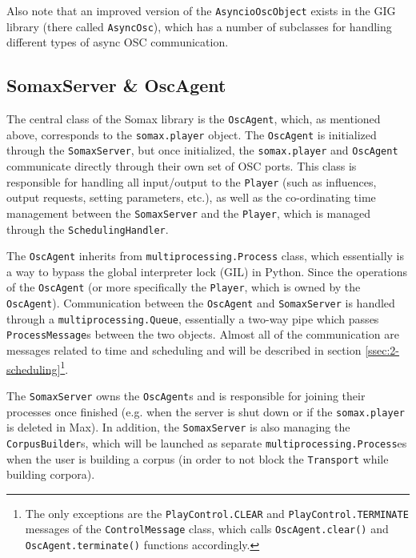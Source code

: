 Also note that an improved version of the \texttt{AsyncioOscObject} exists in the GIG library (there called \texttt{AsyncOsc}), which has a number of subclasses for handling different types of async OSC communication.


\subsection{SomaxServer \& OscAgent}\label{ssec:2-server-agent}
The central class of the Somax library is the \texttt{OscAgent}, which, as mentioned above, corresponds to the \texttt{somax.player} object. The \texttt{OscAgent} is initialized through the \texttt{SomaxServer}, but once initialized, the \texttt{somax.player} and \texttt{OscAgent} communicate directly through their own set of OSC ports. This class is responsible for handling all input/output to the \texttt{Player} (such as influences, output requests, setting parameters, etc.), as well as the co-ordinating time management between the \texttt{SomaxServer} and the \texttt{Player}, which is managed through the \texttt{SchedulingHandler}.

The \texttt{OscAgent} inherits from \texttt{multiprocessing.Process} class, which essentially is a way to bypass the global interpreter lock (GIL) in Python. Since the operations of the \texttt{OscAgent} (or more specifically the \texttt{Player}, which is owned by the \texttt{OscAgent}). Communication between the \texttt{OscAgent} and \texttt{SomaxServer} is handled through a \texttt{multiprocessing.Queue}, essentially a two-way pipe which passes \texttt{ProcessMessage}s between the two objects. Almost all of the communication are messages related to time and scheduling and will be described in section \ref{ssec:2-scheduling}\footnote{The only exceptions are the \texttt{PlayControl.CLEAR} and \texttt{PlayControl.TERMINATE} messages of the \texttt{ControlMessage} class, which calls \texttt{OscAgent.clear()} and \texttt{OscAgent.terminate()} functions accordingly.}.

The \texttt{SomaxServer} owns the \texttt{OscAgent}s and is responsible for joining their processes once finished (e.g. when the server is shut down or if the \texttt{somax.player} is deleted in Max). In addition, the \texttt{SomaxServer} is also managing the \texttt{CorpusBuilder}s, which will be launched as separate \texttt{multiprocessing.Process}es when the user is building a corpus (in order to not block the \texttt{Transport} while building corpora). 

